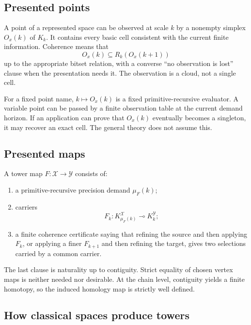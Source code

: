\subsection{Presented points}

A point of a represented space can be observed at scale $k$ by a nonempty simplex $O_x(k)$ of $K_k$.  It contains every basic cell consistent with the current finite information.  Coherence means that
\[
  O_x(k)\subseteq R_k(O_x(k+1))
\]
up to the appropriate bitset relation, with a converse ``no observation is lost'' clause when the presentation needs it.  The observation is a cloud, not a single cell.

For a fixed point name, $k\mapsto O_x(k)$ is a fixed primitive-recursive evaluator.  A variable point can be passed by a finite observation table at the current demand horizon.  If an application can prove that $O_x(k)$ eventually becomes a singleton, it may recover an exact cell.  The general theory does not assume this.

\subsection{Presented maps}

\begin{definition}
A tower map $F:\mathcal X\to\mathcal Y$ consists of:
\begin{enumerate}
  \item a primitive-recursive precision demand $\mu_F(k)$;
  \item carriers
  \[
    F_k:K^{\mathcal X}_{\mu_F(k)}\multimap K^{\mathcal Y}_k;
  \]
  \item a finite coherence certificate saying that refining the source and then applying $F_k$, or applying a finer $F_{k+1}$ and then refining the target, gives two selections carried by a common carrier.
\end{enumerate}
\end{definition}

The last clause is naturality up to contiguity.  Strict equality of chosen vertex maps is neither needed nor desirable.  At the chain level, contiguity yields a finite homotopy, so the induced homology map is strictly well defined.

\subsection{How classical spaces produce towers}

